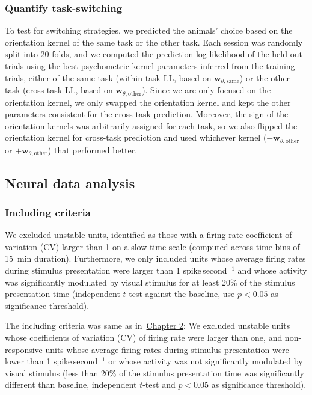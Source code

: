 \documentclass[lineno,pdflatex,sn-basic]{sn-jnl}%
\theoremstyle{thmstyleone}%
\theoremstyle{thmstyletwo}%
\theoremstyle{thmstylethree}%
\begin{document}
\subsubsection{Quantify task-switching} \label{sec_ch2: quantify_behav_switching}
To test for switching strategies, we predicted the animals' choice based on the orientation kernel of the same task or the other task. Each session was randomly split into 20 folds, and we computed the prediction log-likelihood of the held-out trials using the best psychometric kernel parameters inferred from the training trials, either of the same task (within-task LL, based on $\mathbf{w}_{\theta,\textrm{same}}$) or the other task (cross-task LL, based on $\mathbf{w}_{\theta,\textrm{other}}$). Since we are only focused on the orientation kernel, we only swapped the orientation kernel and kept the other parameters consistent for the cross-task prediction. Moreover, the sign of the orientation kernels was arbitrarily assigned for each task, so we also flipped the orientation kernel for cross-task prediction and used whichever kernel ($-\mathbf{w}_{\theta,\textrm{other}}$ or $+\mathbf{w}_{\theta,\textrm{other}}$) that performed better.


\subsection{Neural data analysis}
\subsubsection{Including criteria} \label{sec_ch2:including_criteria}

We excluded unstable units, identified as those with a firing rate coefficient of variation (CV) larger than 1 on a slow time-scale (computed across time bins of 15~min duration). Furthermore, we only included units whose average firing rates during stimulus presentation were larger than 1 spike\,second$^{-1}$ and whose activity was significantly modulated by visual stimulus for at least 20\% of the stimulus presentation time (independent $t$-test against the baseline, use $p<0.05$ as significance threshold). 

The including criteria was same as in~\hyperref[sec_ch1: NA_criteria]{Chapter 2}: We excluded unstable units whose coefficients of variation (CV) of firing rate were larger than one, and non-responsive units whose average firing rates during stimulus-presentation were lower than 1 spike\,second$^{-1}$ or whose activity was not significantly modulated by visual stimulus (less than 20\% of the stimulus presentation time was significantly different than baseline, independent $t$-test and $p<0.05$ as significance threshold).
\end{document}
